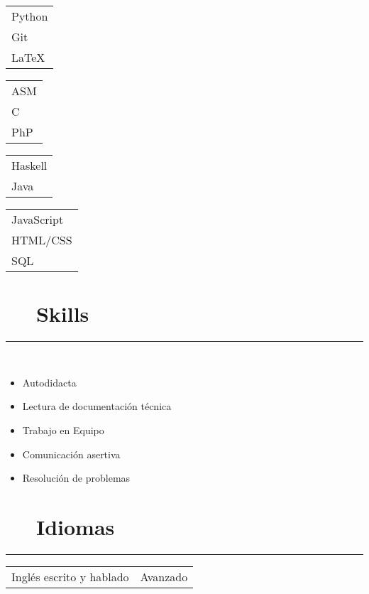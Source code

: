 \documentclass{article}
\begin{document}
\begin{multicols}{4}
    \begin{tabular}{l}
        Python \\
        Git \\
        LaTeX
    \end{tabular}

    \begin{tabular}{l}
        ASM \\
        C   \\
        PhP
    \end{tabular}
    
    \begin{tabular}{l}
        Haskell \\
        Java
    \end{tabular}
    
    \begin{tabular}{l}
        JavaScript \\
        HTML/CSS  \\
        SQL
    \end{tabular}
   
\end{multicols}



\section*{\faCoffee ~~ Skills} 
\hrule
\
\

\begin{multicols}{2}
    \begin{itemize}
        \item Autodidacta
        \item Lectura de documentación técnica
        \item Trabajo en Equipo
        \item Comunicación asertiva
        \item Resolución de problemas
    \end{itemize}
\end{multicols}

\section*{\faLanguage ~~ Idiomas}
\hrule

\begin{tabular}{l | l}
    Inglés escrito y hablado & Avanzado
\end{tabular}
\end{document}
